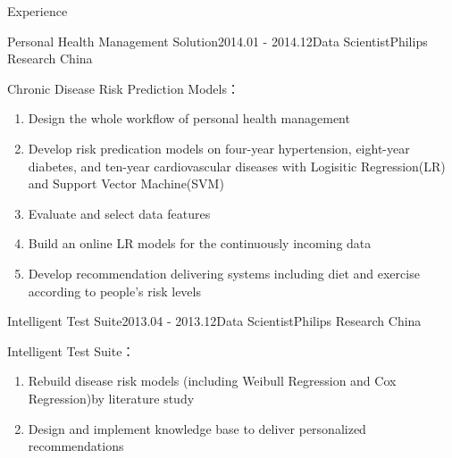 \documentclass{resume} %
\begin{document}
\begin{rSection}{Experience}
\begin{rSubsection}{Personal Health Management Solution}{2014.01 - 2014.12}{Data Scientist}{Philips Research China}
\item  Chronic Disease Risk Prediction Models：
\begin{enumerate}
\item Design the whole workflow of personal health management 
\item Develop risk predication models on four-year hypertension, eight-year diabetes, and ten-year cardiovascular diseases with Logisitic Regression(LR) and Support Vector Machine(SVM)
\item Evaluate and select data features
\item Build an online LR models for the continuously incoming data 
\item Develop recommendation delivering systems including diet and exercise according to people's risk levels 
\end{enumerate}
\end{rSubsection}

\begin{rSubsection}{Intelligent Test Suite}{2013.04 - 2013.12}{Data Scientist}{Philips Research China}
\item Intelligent Test Suite：
\begin{enumerate}
\item Rebuild disease risk models (including Weibull Regression and Cox Regression)by literature study
\item  Design and implement knowledge base to deliver personalized recommendations
\end{enumerate}
\end{rSubsection}


\end{rSection}

\end{document}
